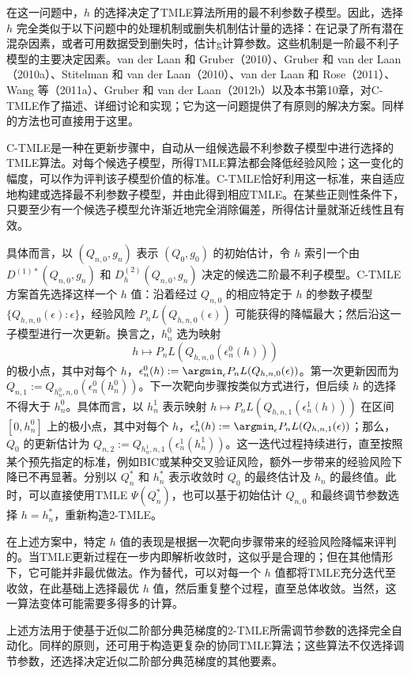 在这一问题中，$h$ 的选择决定了TMLE算法所用的最不利参数子模型。因此，选择 $h$ 完全类似于以下问题中的处理机制或删失机制估计量的选择：在记录了所有潜在混杂因素，或者可用数据受到删失时，估计g计算参数。这些机制是一阶最不利子模型的主要决定因素。van der Laan 和 Gruber（2010）、Gruber 和 van der Laan（2010a）、Stitelman 和 van der Laan（2010）、van der Laan 和 Rose（2011）、Wang 等（2011a）、Gruber 和 van der Laan（2012b）以及本书第10章，对C-TMLE作了描述、详细讨论和实现；它为这一问题提供了有原则的解决方案。同样的方法也可直接用于这里。

C-TMLE是一种在更新步骤中，自动从一组候选最不利参数子模型中进行选择的TMLE算法。对每个候选子模型，所得TMLE算法都会降低经验风险；这一变化的幅度，可以作为评判该子模型价值的标准。C-TMLE恰好利用这一标准，来自适应地构建或选择最不利参数子模型，并由此得到相应TMLE。在某些正则性条件下，只要至少有一个候选子模型允许渐近地完全消除偏差，所得估计量就渐近线性且有效。

具体而言，以 $(Q_{n,0},g_n)$ 表示 $(Q_0,g_0)$ 的初始估计，令 $h$ 索引一个由 $D^{(1)*}(Q_{n,0},g_n)$ 和 $D_h^{(2)}(Q_{n,0},g_n)$ 决定的候选二阶最不利子模型。C-TMLE方案首先选择这样一个 $h$ 值：沿着经过 $Q_{n,0}$ 的相应特定于 $h$ 的参数子模型 $\{Q_{h,n,0}(\epsilon):\epsilon\}$，经验风险 $P_nL(Q_{h,n,0}(\epsilon))$ 可能获得的降幅最大；然后沿这一子模型进行一次更新。换言之，$h_n^0$ 选为映射
\[
h\mapsto P_nL(Q_{h,n,0}(\epsilon_n^0(h)))
\]
的极小点，其中对每个 $h$，$\epsilon_n^0(h):=\argmin_\epsilon P_nL(Q_{h,n,0}(\epsilon))$。第一次更新因而为 $Q_{n,1}:=Q_{h_n^0,n,0}(\epsilon_n^0(h_n^0))$。下一次靶向步骤按类似方式进行，但后续 $h$ 的选择不得大于 $h_n^0$。具体而言，以 $h_n^1$ 表示映射 $h\mapsto P_nL(Q_{h,n,1}(\epsilon_n^1(h)))$ 在区间 $[0,h_n^0]$ 上的极小点，其中对每个 $h$，$\epsilon_n^1(h):=\argmin_\epsilon P_nL(Q_{h,n,1}(\epsilon))$；那么，$Q_0$ 的更新估计为 $Q_{n,2}:=Q_{h_n^1,n,1}(\epsilon_n^1(h_n^1))$。这一迭代过程持续进行，直至按照某个预先指定的标准，例如BIC或某种交叉验证风险，额外一步带来的经验风险下降已不再显著。分别以 $Q_n^*$ 和 $h_n^*$ 表示收敛时 $Q_0$ 的最终估计及 $h_n$ 的最终值。此时，可以直接使用TMLE $\Psi(Q_n^*)$，也可以基于初始估计 $Q_{n,0}$ 和最终调节参数选择 $h=h_n^*$，重新构造2-TMLE。

在上述方案中，特定 $h$ 值的表现是根据一次靶向步骤带来的经验风险降幅来评判的。当TMLE更新过程在一步内即解析收敛时，这似乎是合理的；但在其他情形下，它可能并非最优做法。作为替代，可以对每一个 $h$ 值都将TMLE充分迭代至收敛，在此基础上选择最优 $h$ 值，然后重复整个过程，直至总体收敛。当然，这一算法变体可能需要多得多的计算。

上述方法用于使基于近似二阶部分典范梯度的2-TMLE所需调节参数的选择完全自动化。同样的原则，还可用于构造更复杂的协同TMLE算法；这些算法不仅选择调节参数，还选择决定近似二阶部分典范梯度的其他要素。

